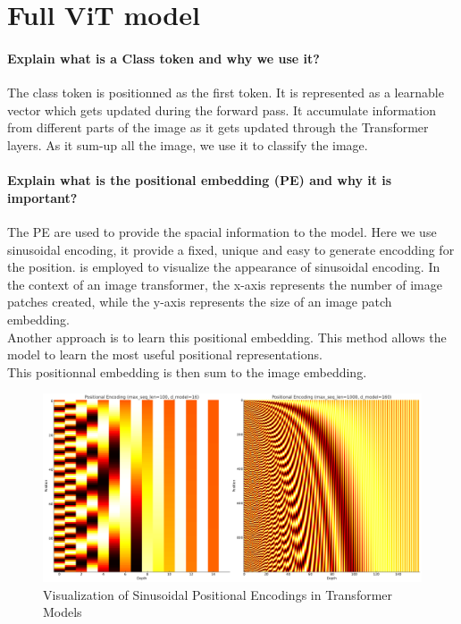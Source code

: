 \section{Full ViT model}

\paragraph{Explain what is a Class token and why we use it?}
The class token is positionned as the first token. It is represented as a learnable vector which gets updated during the forward pass. It accumulate information from different parts of the image as it gets updated through the Transformer layers. As it sum-up all the image, we use it to classify the image.

\paragraph{Explain what is the positional embedding (PE) and why it is important?}
The PE are used to provide the spacial information to the model. Here we use sinusoidal encoding, it provide a fixed, unique and easy to generate encodding for the position.  is employed to visualize the appearance of sinusoidal encoding. In the context of an image transformer, the x-axis represents the number of image patches created, while the y-axis represents the size of an image patch embedding.  \\
Another approach is to learn this positional embedding. This method allows the model to learn the most useful positional representations. \\
This positionnal embedding is then sum to the image embedding.

\begin{figure}[H]
    \centering
    \includegraphics*[width=.75\textwidth]{figs/Transformers/positional_encoding_subplot.pdf}
    \caption{Visualization of Sinusoidal Positional Encodings in Transformer Models}
    \label{fig:pe_viz}
\end{figure}

